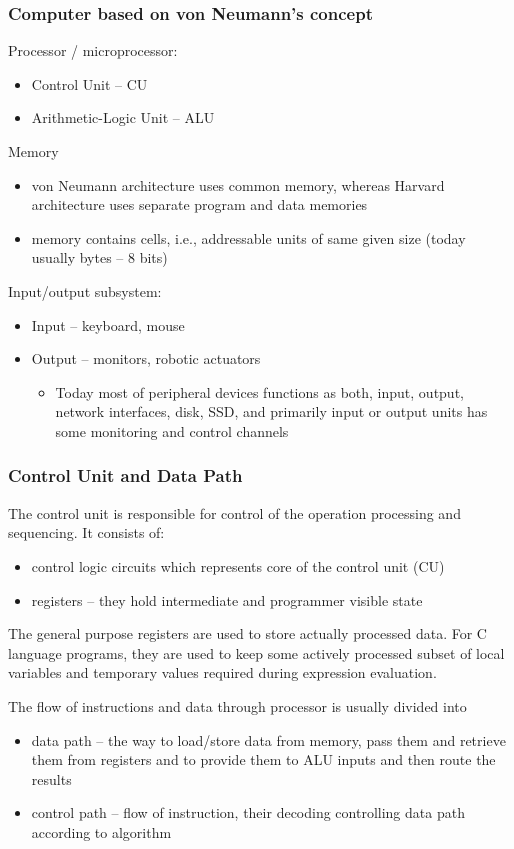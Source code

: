 \documentclass{beamer}
\begin{document}
\begin{frame}
\frametitle{Computer based on von Neumann's concept}

Processor / microprocessor:
\begin{itemize}
\item Control Unit -- CU
\item Arithmetic-Logic Unit -- ALU
\end{itemize}

Memory
\begin{itemize}
\item von Neumann architecture uses common memory, whereas Harvard architecture uses separate program and data memories
\item memory contains cells, i.e., addressable units of same given size (today usually bytes -- 8 bits)
\end{itemize}

Input/output subsystem:
\begin{itemize}
\item Input -- keyboard, mouse
\item Output -- monitors, robotic actuators
\begin{itemize}
\item Today most of peripheral devices functions as both, input, output, network interfaces, disk, SSD, and primarily input or output units has some monitoring and control channels
\end{itemize}
\end{itemize}
\end{frame}


\begin{frame}
\frametitle{Control Unit and Data Path}

The control unit is responsible for control of the operation processing and sequencing. It consists of:
\begin{itemize}
\item control logic circuits which represents core of the control unit (CU)
\item registers -- they hold intermediate and programmer visible state
\end{itemize}

The general purpose registers are used to store actually processed data. For C language programs, they are used to keep some actively processed subset of local variables and temporary values required during expression evaluation.

The flow of instructions and data through processor is usually divided into
\begin{itemize}
\item data path -- the way to load/store data from memory, pass them and retrieve them from registers and to provide them to ALU inputs and then route the results
\item control path -- flow of instruction, their decoding controlling data path according to algorithm
\end{itemize}

\end{frame}
\end{document}
